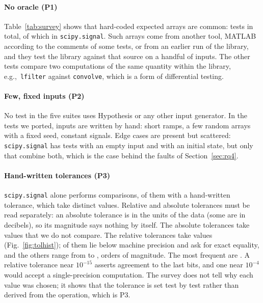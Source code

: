 \documentclass[10pt,conference]{IEEEtran}
\newcommand{\code}[1]{\texttt{#1}}
\newcommand{\eg}{e.g.,\ }
\begin{document}
\paragraph*{No oracle (P1)} Table~\ref{tab:survey} shows that hard-coded
expected arrays are common: \surveyHardcodedAll{} tests in total, of which
\surveyScipyHardcoded{} in \code{scipy.signal}. Such arrays come from another
tool, MATLAB according to the comments of some tests, or from an earlier run of
the library, and they test the library against that source on a handful of
inputs. The other tests compare
two computations of the same quantity within the library, \eg \code{lfilter}
against \code{convolve}, which is a form of differential testing.

\paragraph*{Few, fixed inputs (P2)} No test in the five suites uses Hypothesis
or any other input generator. In the tests we ported, inputs are written by
hand: short ramps, a few random arrays with a fixed seed, constant signals. Edge cases are present
but scattered: \code{scipy.signal} has \surveyScipyEmpty{} tests with an empty
input and \surveyScipyZi{} with an initial state, but only \surveyZiEmpty{} that
combine both, which is the case behind the faults of Section~\ref{sec:rq4}.

\paragraph*{Hand-written tolerances (P3)} \code{scipy.signal} alone performs
\surveyScipyComparisons{} comparisons, \surveyScipyExplicit{} of them with a
hand-written tolerance, which take \surveyScipyDistinctTol{} distinct values.
Relative and absolute tolerances must be read separately: an absolute
tolerance is in the units of the data (some are in decibels), so its magnitude
says nothing by itself. The \surveyScipyAbsCount{} absolute tolerances take
\surveyScipyAbsDistinct{} values that we do not compare. The
\surveyScipyRelCount{} relative tolerances take \surveyScipyRelDistinct{}
values (Fig.~\ref{fig:tolhist}); \surveyScipyRelBelowEps{} of them lie below
machine precision and ask for exact equality, and the others range from
\surveyScipyRelMin{} to \surveyScipyRelMax, \surveyScipyRelDecades{} orders of
magnitude. The most frequent are \surveyScipyTopTols. A relative tolerance near
$10^{-15}$ asserts agreement to the last bits, and one near $10^{-4}$ would
accept a single-precision computation. The survey does not tell why each value
was chosen; it shows that the tolerance is set test by test rather than
derived from the operation, which is P3.
\end{document}
